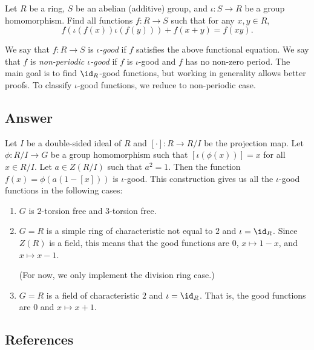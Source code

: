 Let $R$ be a ring, $S$ be an abelian (additive) group, and $\iota : S \to R$ be a group homomorphism.
Find all functions $f : R \to S$ such that for any $x, y \in R$,
\[ f(\iota(f(x)) \iota(f(y))) + f(x + y) = f(xy). \tag{*}\label{2017a6-eq0} \]

We say that $f : R \to S$ is \emph{$\iota$-good} if $f$ satisfies the above functional equation.
We say that $f$ is \emph{non-periodic $\iota$-good} if $f$ is $\iota$-good and $f$ has no non-zero period.
The main goal is to find $\id_R$-good functions, but working in generality allows better proofs.
To classify $\iota$-good functions, we reduce to non-periodic case.





\subsection*{Answer}

Let $I$ be a double-sided ideal of $R$ and $[\cdot] : R \to R/I$ be the projection map.
Let $\phi : R/I \to G$ be a group homomorphism such that $[\iota(\phi(x))] = x$ for all $x \in R/I$.
Let $a \in Z(R/I)$ such that $a^2 = 1$.
Then the function $f(x) = \phi(a(1 - [x]))$ is $\iota$-good.
This construction gives us all the $\iota$-good functions in the following cases:
\begin{enumerate}

    \item 
    $G$ is $2$-torsion free and $3$-torsion free.
    
    \item
    $G = R$ is a simple ring of characteristic not equal to $2$ and $\iota = \id_R$.
    Since $Z(R)$ is a field, this means that the good functions are $0$, $x \mapsto 1 - x$, and $x \mapsto x - 1$.

    (For now, we only implement the division ring case.)
    
    \item
    $G = R$ is a field of characteristic $2$ and $\iota = \id_R$.
    That is, the good functions are $0$ and $x \mapsto x + 1$.

\end{enumerate}





\subsection*{References}

